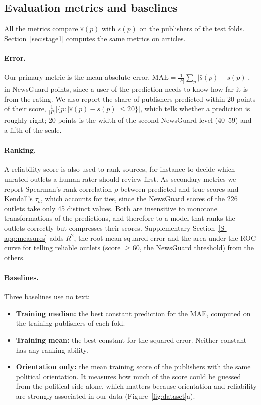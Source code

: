 \documentclass[11pt,a4paper]{article}
\begin{document}
\subsection{Evaluation metrics and baselines}\label{sec:metrics}
All the metrics compare $\hat{s}(p)$ with $s(p)$ on the publishers of the test folds. Section~\ref{sec:stage1} computes
the same metrics on articles.

\paragraph{Error.} Our primary metric is the mean absolute error, $\mathrm{MAE} = \frac{1}{|P|} \sum_{p} |\hat{s}(p) -
s(p)|$, in NewsGuard points, since a user of the prediction needs to know how far it is from the rating. We also report
the share of publishers predicted within 20 points of their score, $\frac{1}{|P|} |\{p : |\hat{s}(p) - s(p)| \leq
20\}|$, which tells whether a prediction is roughly right; 20 points is the width of the second NewsGuard level (40--59)
and a fifth of the scale.

\paragraph{Ranking.} A reliability score is also used to rank sources, for instance to decide which unrated outlets a
human rater should review first. As secondary metrics we report Spearman's rank correlation $\rho$ between predicted and
true scores and Kendall's $\tau_b$, which accounts for ties, since the NewsGuard scores of the 226 outlets take only 45
distinct values. Both are insensitive to monotone transformations of the predictions, and therefore to a model that
ranks the outlets correctly but compresses their scores. Supplementary Section~\ref{S-app:measures} adds $R^2$, the root
mean squared error and the area under the ROC curve for telling reliable outlets (score $\geq 60$, the NewsGuard
threshold) from the others.

\paragraph{Baselines.} Three baselines use no text:
\begin{itemize}
  \item \textbf{Training median:} the best constant prediction for the MAE, computed on the training publishers of each
        fold.
  \item \textbf{Training mean:} the best constant for the squared error. Neither constant has any ranking ability.
  \item \textbf{Orientation only:} the mean training score of the publishers with the same political orientation. It
        measures how much of the score could be guessed from the political side alone, which matters because orientation
        and reliability are strongly associated in our data (Figure~\ref{fig:dataset}a).
\end{itemize}
\end{document}
